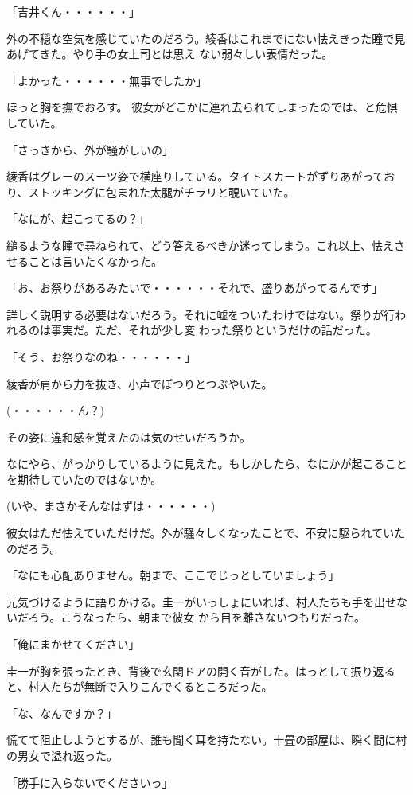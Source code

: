 ﻿\documentclass[book,tate]{jlreq}
\begin{document}
「吉井くん・・・・・・」

外の不穏な空気を感じていたのだろう。綾香はこれまでにない怯えきった瞳で見あげてきた。やり手の女上司とは思え ない弱々しい表情だった。

「よかった・・・・・・無事でしたか」

ほっと胸を撫でおろす。 彼女がどこかに連れ去られてしまったのでは、と危惧していた。

「さっきから、外が騒がしいの」

綾香はグレーのスーツ姿で横座りしている。タイトスカートがずりあがっており、ストッキングに包まれた太腿がチラリと覗いていた。

「なにが、起こってるの？」

縋るような瞳で尋ねられて、どう答えるべきか迷ってしまう。これ以上、怯えさせることは言いたくなかった。

「お、お祭りがあるみたいで・・・・・・それで、盛りあがってるんです」

詳しく説明する必要はないだろう。それに嘘をついたわけではない。祭りが行われるのは事実だ。ただ、それが少し変 わった祭りというだけの話だった。

「そう、お祭りなのね・・・・・・」

綾香が肩から力を抜き、小声でぽつりとつぶやいた。

(・・・・・・ん？)

その姿に違和感を覚えたのは気のせいだろうか。

なにやら、がっかりしているように見えた。もしかしたら、なにかが起こることを期待していたのではないか。

(いや、まさかそんなはずは・・・・・・)

彼女はただ怯えていただけだ。外が騒々しくなったことで、不安に駆られていたのだろう。

「なにも心配ありません。朝まで、ここでじっとしていましょう」

元気づけるように語りかける。圭一がいっしょにいれば、村人たちも手を出せないだろう。こうなったら、朝まで彼女 から目を離さないつもりだった。

「俺にまかせてください」

圭一が胸を張ったとき、背後で玄関ドアの開く音がした。はっとして振り返ると、村人たちが無断で入りこんでくるところだった。

「な、なんですか？」

慌てて阻止しようとするが、誰も聞く耳を持たない。十畳の部屋は、瞬く間に村の男女で溢れ返った。

「勝手に入らないでくださいっ」
\end{document}
